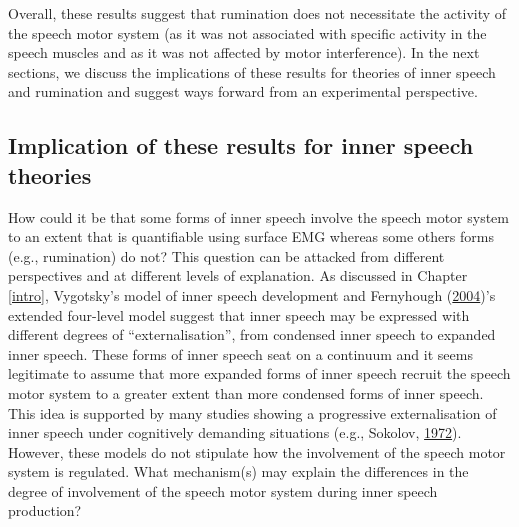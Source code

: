\documentclass[a4paper,12pt,twoside,openright,oldfontcommands]{memoir}
\begin{document}
Overall, these results suggest that rumination does not necessitate the activity of the speech motor system (as it was not associated with specific activity in the speech muscles and as it was not affected by motor interference). In the next sections, we discuss the implications of these results for theories of inner speech and rumination and suggest ways forward from an experimental perspective.

\hypertarget{implication-of-these-results-for-inner-speech-theories}{%
\subsection{Implication of these results for inner speech theories}\label{implication-of-these-results-for-inner-speech-theories}}

How could it be that some forms of inner speech involve the speech motor system to an extent that is quantifiable using surface EMG whereas some others forms (e.g., rumination) do not? This question can be attacked from different perspectives and at different levels of explanation. As discussed in Chapter \ref{intro}, Vygotsky's model of inner speech development and Fernyhough (\protect\hyperlink{ref-fernyhough_alien_2004}{2004})'s extended four-level model suggest that inner speech may be expressed with different degrees of \enquote{externalisation}, from condensed inner speech to expanded inner speech. These forms of inner speech seat on a continuum and it seems legitimate to assume that more expanded forms of inner speech recruit the speech motor system to a greater extent than more condensed forms of inner speech. This idea is supported by many studies showing a progressive externalisation of inner speech under cognitively demanding situations (e.g., Sokolov, \protect\hyperlink{ref-sokolov_inner_1972}{1972}). However, these models do not stipulate how the involvement of the speech motor system is regulated. What mechanism(s) may explain the differences in the degree of involvement of the speech motor system during inner speech production?
\end{document}
